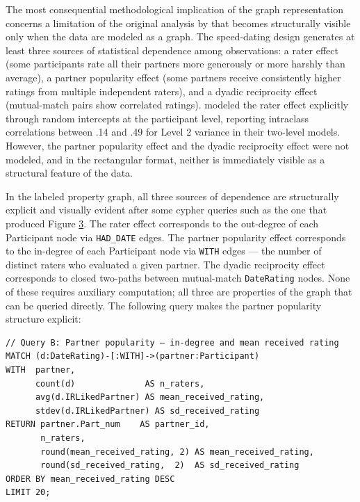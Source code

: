 \documentclass[sn-apa,pdflatex]{sn-jnl}
\theoremstyle{remark}
\theoremstyle{definition}
\begin{document}
The most consequential methodological implication of the graph
representation concerns a limitation of the original analysis by
\citet{Selterman2015} that becomes structurally visible only when the
data are modeled as a graph. The speed-dating design generates at least
three sources of statistical dependence among observations: a rater
effect (some participants rate all their partners more generously or
more harshly than average), a partner popularity effect (some partners
receive consistently higher ratings from multiple independent raters),
and a dyadic reciprocity effect (mutual-match pairs show correlated
ratings). \citet{Selterman2015} modeled the rater effect explicitly
through random intercepts at the participant level, reporting intraclass
correlations between .14 and .49 for Level 2 variance in their two-level
models. However, the partner popularity effect and the dyadic
reciprocity effect were not modeled, and in the rectangular format,
neither is immediately visible as a structural feature of the data.

In the labeled property graph, all three sources of dependence are
structurally explicit and visually evident after some cypher queries
such as the one that produced Figure \hyperref[fig:F5]{3}. The rater
effect corresponds to the out-degree of each Participant node via
\texttt{HAD\_DATE} edges. The partner popularity effect corresponds to
the in-degree of each Participant node via \texttt{WITH} edges --- the
number of distinct raters who evaluated a given partner. The dyadic
reciprocity effect corresponds to closed two-paths between mutual-match
\texttt{DateRating} nodes. None of these requires auxiliary computation;
all three are properties of the graph that can be queried directly. The
following query makes the partner popularity structure explicit:

\begin{verbatim}
// Query B: Partner popularity — in-degree and mean received rating
MATCH (d:DateRating)-[:WITH]->(partner:Participant)
WITH  partner,
      count(d)              AS n_raters,
      avg(d.IRLikedPartner) AS mean_received_rating,
      stdev(d.IRLikedPartner) AS sd_received_rating
RETURN partner.Part_num    AS partner_id,
       n_raters,
       round(mean_received_rating, 2) AS mean_received_rating,
       round(sd_received_rating,  2)  AS sd_received_rating
ORDER BY mean_received_rating DESC
LIMIT 20;
\end{verbatim}
\end{document}
